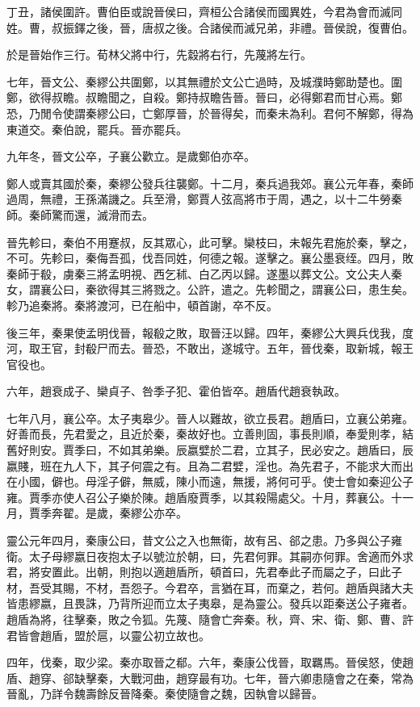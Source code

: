 丁丑，諸侯圍許。曹伯臣或說晉侯曰，齊桓公合諸侯而國異姓，今君為會而滅同姓。曹，叔振鐸之後，晉，唐叔之後。合諸侯而滅兄弟，非禮。晉侯說，復曹伯。

於是晉始作三行。荀林父將中行，先縠將右行，先蔑將左行。

七年，晉文公、秦繆公共圍鄭，以其無禮於文公亡過時，及城濮時鄭助楚也。圍鄭，欲得叔瞻。叔瞻聞之，自殺。鄭持叔瞻告晉。晉曰，必得鄭君而甘心焉。鄭恐，乃閒令使謂秦繆公曰，亡鄭厚晉，於晉得矣，而秦未為利。君何不解鄭，得為東道交。秦伯說，罷兵。晉亦罷兵。

九年冬，晉文公卒，子襄公歡立。是歲鄭伯亦卒。

鄭人或賣其國於秦，秦繆公發兵往襲鄭。十二月，秦兵過我郊。襄公元年春，秦師過周，無禮，王孫滿譏之。兵至滑，鄭賈人弦高將市于周，遇之，以十二牛勞秦師。秦師驚而還，滅滑而去。

晉先軫曰，秦伯不用蹇叔，反其眾心，此可擊。欒枝曰，未報先君施於秦，擊之，不可。先軫曰，秦侮吾孤，伐吾同姓，何德之報。遂擊之。襄公墨衰绖。四月，敗秦師于殽，虜秦三將孟明視、西乞秫、白乙丙以歸。遂墨以葬文公。文公夫人秦女，謂襄公曰，秦欲得其三將戮之。公許，遣之。先軫聞之，謂襄公曰，患生矣。軫乃追秦將。秦將渡河，已在船中，頓首謝，卒不反。

後三年，秦果使孟明伐晉，報殽之敗，取晉汪以歸。四年，秦繆公大興兵伐我，度河，取王官，封殽尸而去。晉恐，不敢出，遂城守。五年，晉伐秦，取新城，報王官役也。

六年，趙衰成子、欒貞子、咎季子犯、霍伯皆卒。趙盾代趙衰執政。

七年八月，襄公卒。太子夷皋少。晉人以難故，欲立長君。趙盾曰，立襄公弟雍。好善而長，先君愛之，且近於秦，秦故好也。立善則固，事長則順，奉愛則孝，結舊好則安。賈季曰，不如其弟樂。辰嬴嬖於二君，立其子，民必安之。趙盾曰，辰嬴賤，班在九人下，其子何震之有。且為二君嬖，淫也。為先君子，不能求大而出在小國，僻也。母淫子僻，無威，陳小而遠，無援，將何可乎。使士會如秦迎公子雍。賈季亦使人召公子樂於陳。趙盾廢賈季，以其殺陽處父。十月，葬襄公。十一月，賈季奔翟。是歲，秦繆公亦卒。

靈公元年四月，秦康公曰，昔文公之入也無衛，故有呂、郤之患。乃多與公子雍衛。太子母繆嬴日夜抱太子以號泣於朝，曰，先君何罪。其嗣亦何罪。舍適而外求君，將安置此。出朝，則抱以適趙盾所，頓首曰，先君奉此子而屬之子，曰此子材，吾受其賜，不材，吾怨子。今君卒，言猶在耳，而棄之，若何。趙盾與諸大夫皆患繆嬴，且畏誅，乃背所迎而立太子夷皋，是為靈公。發兵以距秦送公子雍者。趙盾為將，往擊秦，敗之令狐。先蔑、隨會亡奔秦。秋，齊、宋、衛、鄭、曹、許君皆會趙盾，盟於扈，以靈公初立故也。

四年，伐秦，取少梁。秦亦取晉之郩。六年，秦康公伐晉，取羈馬。晉侯怒，使趙盾、趙穿、郤缺擊秦，大戰河曲，趙穿最有功。七年，晉六卿患隨會之在秦，常為晉亂，乃詳令魏壽餘反晉降秦。秦使隨會之魏，因執會以歸晉。

